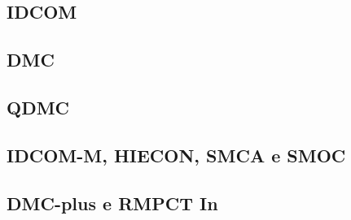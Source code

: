
\subsection{IDCOM}
\label{subsec:idcom}


\subsection{DMC}
\label{subsec:dmc}


\subsection{QDMC}
\label{subsec:qdmc}


\subsection{IDCOM-M, HIECON, SMCA e SMOC}
\label{subsec:idcomm}


\subsection{DMC-plus e RMPCT In}
\label{subsec:dmcplus}


